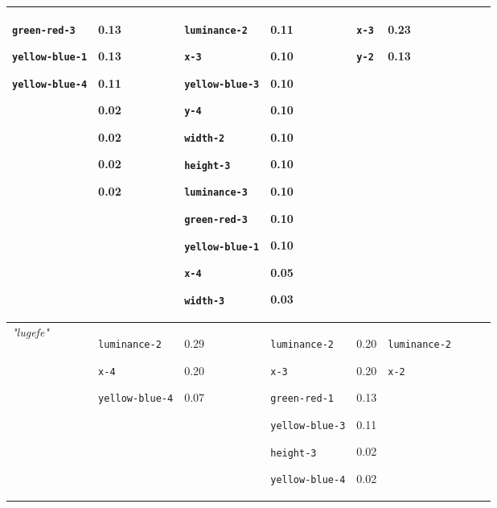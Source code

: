 {\begin{tabular}{@{}p{0.95cm}|p{1.9cm}@{}p{0.6cm}@{}|p{1.9cm}@{}p{0.6cm}@{}|p{1.9cm}@{}p{0.6cm}@{}|p{1.9cm}@{}p{0.5cm}@{}}
\texttt{green-red-3}

\texttt{yellow-blue-1}

\texttt{yellow-blue-4} & 0.13

0.13

0.11

0.02

0.02

0.02

0.02 & \texttt{luminance-2}

\texttt{x-3}

\texttt{yellow-blue-3}

\texttt{y-4}

\texttt{width-2}

\texttt{height-3}

\texttt{luminance-3}

\texttt{green-red-3}

\texttt{yellow-blue-1}

\texttt{x-4}

\texttt{width-3} & 0.11

0.10

0.10

0.10

0.10

0.10

0.10

0.10

0.10

0.05

0.03 & \texttt{x-3}

\texttt{y-2} & 0.23

0.13\\
\hline
\textit{"lugefe"} & \texttt{luminance-2}

\texttt{x-4}

\texttt{yellow-blue-4} & 0.29

0.20

0.07 & \texttt{luminance-2}

\texttt{x-3}

\texttt{green-red-1}

\texttt{yellow-blue-3}

\texttt{height-3}

\texttt{yellow-blue-4} & 0.20

0.20

0.13

0.11

0.02

0.02 & \texttt{luminance-2}

\texttt{x-2}


\end{tabular}}
